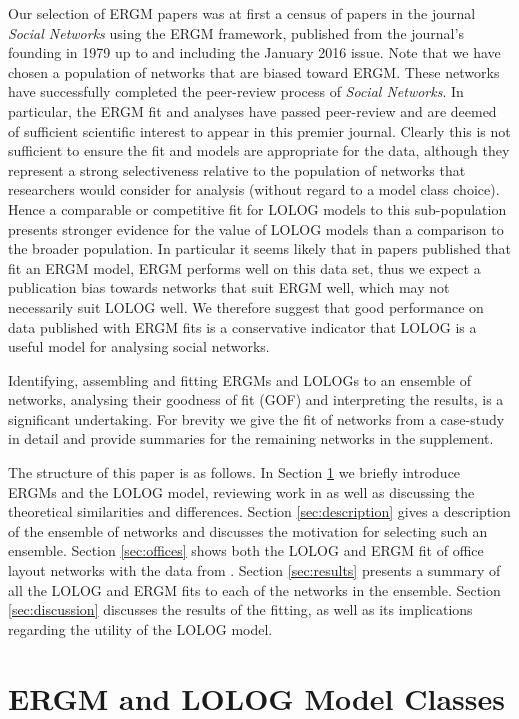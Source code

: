 \documentclass[
]{statsoc}
\begin{document}
Our selection of ERGM papers was at first a census of papers in the
journal \textit{Social Networks} using the ERGM framework, published
from the journal's founding in 1979 up to and including the January 2016
issue. Note that we have chosen a population of networks that are biased
toward ERGM. These networks have successfully completed the peer-review
process of \textit{Social Networks}. In particular, the ERGM fit and
analyses have passed peer-review and are deemed of sufficient scientific
interest to appear in this premier journal. Clearly this is not
sufficient to ensure the fit and models are appropriate for the data,
although they represent a strong selectiveness relative to the
population of networks that researchers would consider for analysis
(without regard to a model class choice). Hence a comparable or
competitive fit for LOLOG models to this sub-population presents
stronger evidence for the value of LOLOG models than a comparison to the
broader population. In particular it seems likely that in papers
published that fit an ERGM model, ERGM performs well on this data set,
thus we expect a publication bias towards networks that suit ERGM well,
which may not necessarily suit LOLOG well. We therefore suggest that
good performance on data published with ERGM fits is a conservative
indicator that LOLOG is a useful model for analysing social networks.

Identifying, assembling and fitting ERGMs and LOLOGs to an ensemble of
networks, analysing their goodness of fit (GOF) and interpreting the
results, is a significant undertaking. For brevity we give the fit of
networks from a case-study \citep{Sailer2012} in detail and provide
summaries for the remaining networks in the supplement.

The structure of this paper is as follows. In Section \ref{sec:LOLOG} we
briefly introduce ERGMs and the LOLOG model, reviewing work in
\cite{Fellows2018} as well as discussing the theoretical similarities
and differences. Section \ref{sec:description} gives a description of
the ensemble of networks and discusses the motivation for selecting such
an ensemble. Section \ref{sec:offices} shows both the LOLOG and ERGM fit
of office layout networks with the data from \cite{Sailer2012}. Section
\ref{sec:results} presents a summary of all the LOLOG and ERGM fits to
each of the networks in the ensemble. Section \ref{sec:discussion}
discusses the results of the fitting, as well as its implications
regarding the utility of the LOLOG model.

\section{ERGM and LOLOG Model Classes}\label{sec:LOLOG}
\end{document}
